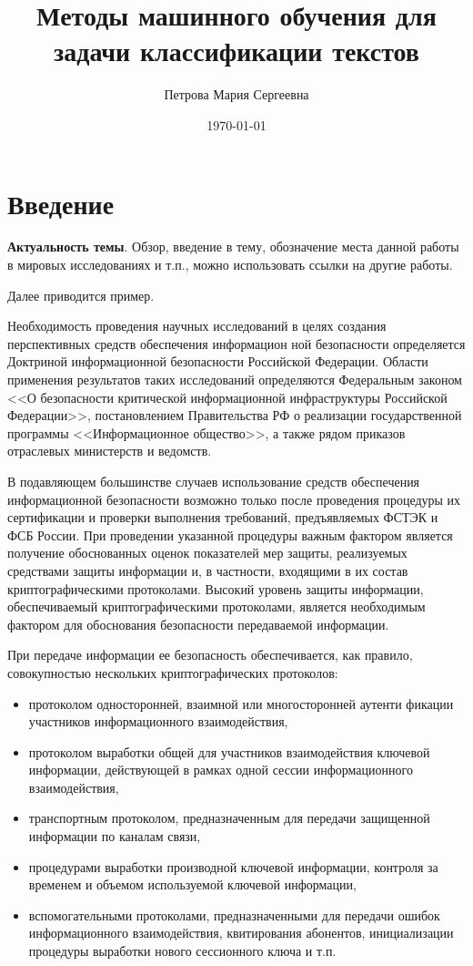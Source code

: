 \documentclass[14pt]{cmcmsuthesis-bachelor}
\author{Петрова Мария Сергеевна}
\date{\today}
\title{Методы машинного обучения для задачи классификации текстов}
\begin{document}
\maketitle
\tableofcontents

\section*{Введение}
\label{sec:orgdb3380a}

\textbf{Актуальность темы}.
Обзор, введение в тему, обозначение места данной работы в мировых исследованиях и т.п., можно использовать ссылки на другие
работы.

Далее приводится пример.

Необходимость проведения научных исследований в целях создания перспективных средств обеспечения информацион ной безопасности определяется Доктриной информационной безопасности Российской Федерации.
Области применения результатов таких исследований определяются Федеральным законом {}<<О безопасности критической информационной инфраструктуры Российской Федерации>>{}, постановлением Правительства РФ о реализации государственной программы {}<<Информационное общество>>{}, а также рядом приказов отраслевых министерств и ведомств.

В подавляющем большинстве случаев использование средств обеспечения информационной безопасности возможно только после проведения процедуры их сертификации и проверки выполнения требований, предъявляемых ФСТЭК и ФСБ России.
При проведении указанной процедуры важным фактором является получение обоснованных оценок показателей мер защиты, реализуемых средствами защиты информации и, в частности, входящими в их состав криптографическими протоколами.
Высокий уровень защиты информации, обеспечиваемый криптографическими протоколами, является необходимым фактором для обоснования безопасности передаваемой информации.

При передаче информации ее безопасность обеспечивается, как правило, совокупностью нескольких криптографических протоколов:
\begin{itemize}
\item протоколом односторонней, взаимной или многосторонней аутенти фикации участников информационного взаимодействия,
\item протоколом выработки общей для участников взаимодействия ключевой информации, действующей в рамках одной сессии информационного взаимодействия,
\item транспортным протоколом, предназначенным для передачи защищенной информации по каналам связи,
\item процедурами выработки производной ключевой информации, контроля за временем и объемом используемой ключевой информации,
\item вспомогательными протоколами, предназначенными для передачи ошибок информационного взаимодействия, квитирования абонентов, инициализации процедуры выработки нового сессионного ключа и т.п.
\end{itemize}
\end{document}
